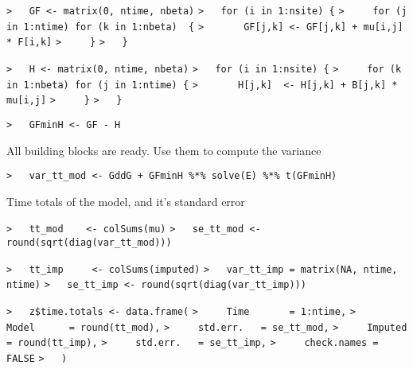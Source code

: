 \documentclass[a4paper]{article}
\begin{document}
\verb~>   GF <- matrix(0, ntime, nbeta)~\newline
\verb~>   for (i in 1:nsite) {~\newline
\verb~>     for (j in 1:ntime) for (k in 1:nbeta)  {~\newline
\verb~>       GF[j,k] <- GF[j,k] + mu[i,j] * F[i,k]~\newline
\verb~>     }~\newline
\verb~>   }~\par

\verb~>   H <- matrix(0, ntime, nbeta)~\newline
\verb~>   for (i in 1:nsite) {~\newline
\verb~>     for (k in 1:nbeta) for (j in 1:ntime) {~\newline
\verb~>       H[j,k]  <- H[j,k] + B[j,k] * mu[i,j]~\newline
\verb~>     }~\newline
\verb~>   }~\par

\verb~>   GFminH <- GF - H~\par

All building blocks are ready. Use them to compute the variance\par
\verb~>   var_tt_mod <- GddG + GFminH %*% solve(E) %*% t(GFminH)~\par


Time totals of the model, and it's standard error\par
\verb~>   tt_mod    <- colSums(mu)~\newline
\verb~>   se_tt_mod <- round(sqrt(diag(var_tt_mod)))~\par

\verb~>   tt_imp     <- colSums(imputed)~\newline
\verb~>   var_tt_imp = matrix(NA, ntime, ntime)~\newline
\verb~>   se_tt_imp <- round(sqrt(diag(var_tt_imp)))~\par

\verb~>   z$time.totals <- data.frame(~\newline
\verb~>     Time       = 1:ntime,~\newline
\verb~>     Model      = round(tt_mod),~\newline
\verb~>     std.err.   = se_tt_mod,~\newline
\verb~>     Imputed    = round(tt_imp),~\newline
\verb~>     std.err.   = se_tt_imp,~\newline
\verb~>     check.names = FALSE~\newline
\verb~>   )~\par
\end{document}
